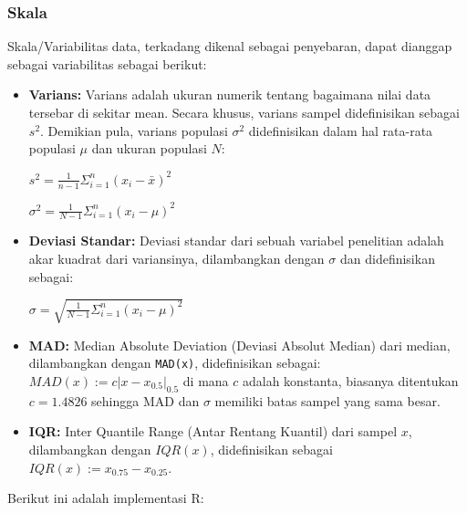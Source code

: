 \documentclass[
]{book}
\newenvironment{Shaded}{\begin{snugshade}}{\end{snugshade}}
\newcommand{\CommentTok}[1]{\textcolor[rgb]{0.56,0.35,0.01}{\textit{#1}}}
\newcommand{\FunctionTok}[1]{\textcolor[rgb]{0.13,0.29,0.53}{\textbf{#1}}}
\newcommand{\NormalTok}[1]{#1}
\newcommand{\SpecialCharTok}[1]{\textcolor[rgb]{0.81,0.36,0.00}{\textbf{#1}}}
\begin{document}
\hypertarget{skala}{%
\subsubsection*{Skala}\label{skala}}

Skala/Variabilitas data, terkadang dikenal sebagai penyebaran, dapat dianggap sebagai variabilitas sebagai berikut:

\begin{itemize}
\item
  \textbf{Varians:} Varians adalah ukuran numerik tentang bagaimana nilai data tersebar di sekitar mean. Secara khusus, varians sampel didefinisikan sebagai \(s^2\). Demikian pula, varians populasi \(\sigma^2\) didefinisikan dalam hal rata-rata populasi \(\mu\) dan ukuran populasi \(N\):

  \(s^2=\frac{1}{n-1}{\Sigma^n_{i=1}{(x_i-\bar{x})^2}}\)

  \(\sigma^2=\frac{1}{N-1}{\Sigma^n_{i=1}{(x_i-\mu)^2}}\)
\item
  \textbf{Deviasi Standar:} Deviasi standar dari sebuah variabel penelitian adalah akar kuadrat dari variansinya, dilambangkan dengan \(\sigma\) dan didefinisikan sebagai:

  \(\sigma=\sqrt{\frac{1}{N-1}{\Sigma^n_{i=1}{(x_i-\mu)^2}}}\)
\item
  \textbf{MAD:} Median Absolute Deviation (Deviasi Absolut Median) dari median, dilambangkan dengan \texttt{MAD(x)}, didefinisikan sebagai: \(MAD(x):=c|x-x_{0.5}|_{0.5}\) di mana \(c\) adalah konstanta, biasanya ditentukan \(c=1.4826\) sehingga MAD dan \(\sigma\) memiliki batas sampel yang sama besar.
\item
  \textbf{IQR:} Inter Quantile Range (Antar Rentang Kuantil) dari sampel \(x\), dilambangkan dengan \(IQR(x)\), didefinisikan sebagai \(IQR(x):=x_{0.75}-x_{0.25}\).
\end{itemize}

Berikut ini adalah implementasi R:

\begin{Shaded}
\end{Shaded}
\end{document}
